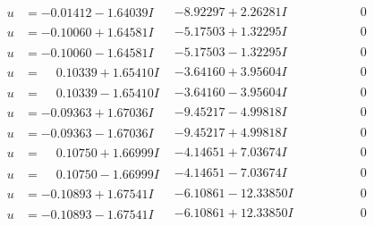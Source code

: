 \documentclass[1p]{elsarticle_modified}
\theoremstyle{definition}
\begin{document}
$$\begin{array}{c|c|c}
 \hline 
\begin{aligned}
u &= -0.01412 - 1.64039 I\end{aligned}
 & -8.92297 + 2.26281 I & \phantom{-0.000000 } 0 \\ \hline\begin{aligned}
u &= -0.10060 + 1.64581 I\end{aligned}
 & -5.17503 + 1.32295 I & \phantom{-0.000000 } 0 \\ \hline\begin{aligned}
u &= -0.10060 - 1.64581 I\end{aligned}
 & -5.17503 - 1.32295 I & \phantom{-0.000000 } 0 \\ \hline\begin{aligned}
u &= \phantom{-}0.10339 + 1.65410 I\end{aligned}
 & -3.64160 + 3.95604 I & \phantom{-0.000000 } 0 \\ \hline\begin{aligned}
u &= \phantom{-}0.10339 - 1.65410 I\end{aligned}
 & -3.64160 - 3.95604 I & \phantom{-0.000000 } 0 \\ \hline\begin{aligned}
u &= -0.09363 + 1.67036 I\end{aligned}
 & -9.45217 - 4.99818 I & \phantom{-0.000000 } 0 \\ \hline\begin{aligned}
u &= -0.09363 - 1.67036 I\end{aligned}
 & -9.45217 + 4.99818 I & \phantom{-0.000000 } 0 \\ \hline\begin{aligned}
u &= \phantom{-}0.10750 + 1.66999 I\end{aligned}
 & -4.14651 + 7.03674 I & \phantom{-0.000000 } 0 \\ \hline\begin{aligned}
u &= \phantom{-}0.10750 - 1.66999 I\end{aligned}
 & -4.14651 - 7.03674 I & \phantom{-0.000000 } 0 \\ \hline\begin{aligned}
u &= -0.10893 + 1.67541 I\end{aligned}
 & -6.10861 - 12.33850 I & \phantom{-0.000000 } 0 \\ \hline\begin{aligned}
u &= -0.10893 - 1.67541 I\end{aligned}
 & -6.10861 + 12.33850 I & \phantom{-0.000000 } 0 \\ \hline\begin{aligned}

\end{aligned}
\end{array}$$
\end{document}
